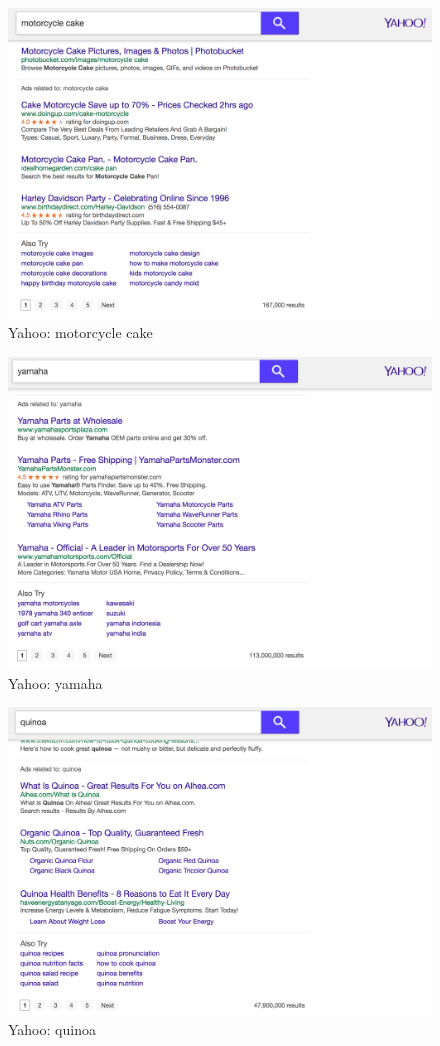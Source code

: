 \documentclass[10pt,letterpaper,bibliography=totoc]{scrartcl}
\begin{document}
\begin{figure}
\centering
\label{fig:motorcycleCakeYahoo}
\includegraphics[scale=.3]{motorcycle-cake_yahoo.png}
\caption{Yahoo: motorcycle cake}
\end{figure}
\begin{figure}
\centering
\label{fig:yamahaYahoo}
\includegraphics[scale=.3]{yamaha_yahoo.png}
\caption{Yahoo: yamaha}
\end{figure}
\begin{figure}
\centering
\label{fig:quinoaYahoo}
\includegraphics[scale=.3]{quinoa_yahoo.png}
\caption{Yahoo: quinoa}
\end{figure}
\end{document}
